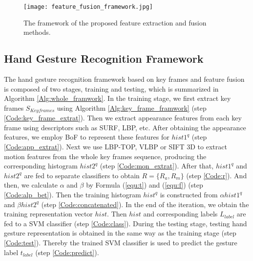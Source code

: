 \documentclass[5p]{elsarticle}
\begin{document}
\begin{figure*}[!tbp]
	\begin{centering}
		\texttt{[image: feature\_fusion\_framework.jpg]}
		\caption{The framework of the proposed feature extraction and fusion methods.}
		\label{Figure:feature_fusion}
	\end{centering}
\end{figure*}

\subsection{Hand Gesture Recognition Framework}
The hand gesture recognition framework based on key frames and feature fusion is composed of two stages, training and testing, which is summarized in Algorithm \ref{Alg:whole_framwork}.
In the training stage, we first extract key frames $S_\mathit{Keyframes}$ using Algorithm \ref{Alg:key_frame_framwork} (step \ref{Code:key_frame_extrat}).
Then we extract appearance features from each key frame using descriptors such as SURF, LBP, etc.
After obtaining the appearance features, we employ BoF \cite{liu2016sequential,dardas2011real} to represent these features for ${hist1}^q$ (step \ref{Code:app_extrat}).
Next we use LBP-TOP, VLBP or SIFT 3D to extract motion features from the whole key frames sequence, producing the corresponding histogram ${hist2}^q$ (step \ref{Code:mon_extrat}).
After that, ${hist1}^q$ and ${hist2}^q$ are fed to separate classifiers to obtain $R= \{R_a, R_m\}$ (step \ref{Code:r}).
And then, we calculate $\alpha$ and $\beta$ by Formula (\ref{equ:t}) and (\ref{equ:f}) (step \ref{Code:alp_bet}).
Then the training histogram ${hist}^q$ is constructed from $\alpha{hist1}^q$ and $\beta{hist2}^q$ (step \ref{Code:concatenated}).
In the end of the iteration, we obtain the training representation vector $hist$.
Then $hist$ and corresponding labels $L_{label}$ are fed to a SVM classifier (step \ref{Code:class}).
During the testing stage, testing hand gesture representation is obtained in the same way as the training stage (step \ref{Code:test}).
Thereby the trained SVM classifier is used to predict the gesture label $t_{label}$ (step \ref{Code:predict}).
\end{document}
